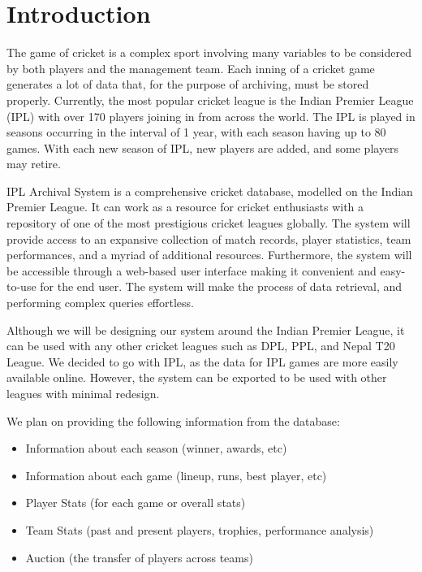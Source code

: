 \documentclass[titlepage]{article}
\begin{document}
\section{Introduction}
The game of cricket is a complex sport involving many variables to be considered by both players and the management team. Each inning of a cricket game generates a lot of data that, for the purpose of archiving, must be stored properly. Currently, the most popular cricket league is the Indian Premier League (IPL) with over 170 players joining in from across the world. The IPL is played in seasons occurring in the interval of 1 year, with each season having up to 80 games. With each new season of IPL, new players are added, and some players may retire.

\noindent
IPL Archival System is a comprehensive cricket database, modelled on the Indian Premier League. It can work as a resource for cricket enthusiasts with a repository of one of the most prestigious cricket leagues globally. The system will provide access to an expansive collection of match records, player statistics, team performances, and a myriad of additional resources. Furthermore, the system will be accessible through a web-based user interface making it convenient and easy-to-use for the end user. The system will make the process of data retrieval, and performing complex queries effortless.

\noindent
Although we will be designing our system around the Indian Premier League, it can be used with any other cricket leagues such as DPL, PPL, and Nepal T20 League. We decided to go with IPL, as the data for IPL games are more easily available online. However, the system can be exported to be used with other leagues with minimal redesign.

\noindent
We plan on providing the following information from the database:
\begin{itemize}
    \item Information about each season (winner, awards, etc)
    \item Information about each game (lineup, runs, best player, etc)
    \item Player Stats (for each game or overall stats)
    \item Team Stats (past and present players, trophies, performance analysis)
    \item Auction (the transfer of players across teams)
    
\end{itemize}
\end{document}
